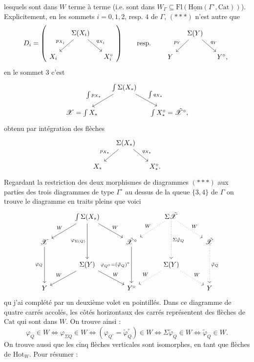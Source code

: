 \documentclass[11pt]{article}
\newcommand{\printedpage}[1]{\marginpar{\footnotesize p.~#1}}
\newcommand{\msp}[1]{\marginpar{\footnotesize [#1]}}
\newcommand{\Cat}{\mathrm{Cat}}
\newcommand{\Hom}{\mathrm{Hom}}
\newcommand{\Hot}{\mathrm{Hot}}
\newcommand{\Fl}{\mathrm{Fl}}
\newcommand{\sX}{\mathscr{X}}
\newcommand{\tsX}{\tilde{\mathscr{X}}}
\begin{document}
lesquels sont dans $W$ terme à terme (i.e. sont dans $W_\Gamma\subseteq\Fl(\underline{\Hom}(\Gamma^\circ,\Cat))$). Explicitement, en les sommets $i=0,1,2$, resp. $4$ de $\Gamma$, $(***)$ n'est autre que
\[
D_i =
\left(
\begin{tikzcd}[column sep=small]
 & \Sigma(X_i) \arrow[dl, "p_{X_i}"'] \arrow[dr, "q_{X_i}"] & \\
X_i & & X_i^\circ
\end{tikzcd}
\right)
\qquad \text{resp.} \qquad
\begin{tikzcd}[column sep=small]
 & \Sigma(Y) \arrow[dl, "p_Y"'] \arrow[dr, "q_Y"] & \\
Y & & Y^\circ,
\end{tikzcd}
\]
en le sommet 3 c'est
\[
\begin{tikzcd}[column sep=small]
 & \int\Sigma(X_*) \arrow[dl, "\int p_{X_*}"'] \arrow[dr, "\int q_{X_*}"] & \\
\sX=\int X_* & & \int X_*^\circ=\tsX^\circ,
\end{tikzcd}
\]
obtenu par intégration des flèches
\[
\begin{tikzcd}[column sep=small]
 & \Sigma(X_*) \arrow[dl, "p_{X_*}"'] \arrow[dr, "q_{X_*}"] & \\
X_* & & X_*^\circ.
\end{tikzcd}
\]
\msp{page 140}
Regardant la restriction des deux morphismes de diagrammes $(***)$ aux parties des trois diagrammes de type $\Gamma^\circ$ au dessus de la queue $\{3,4\}$ de $\Gamma$ on trouve le diagramme en traits pleins que voici
\[
\begin{tikzcd}[column sep=3em, row sep=normal]
 & \int\Sigma(X_*) \arrow[dl, "W"'] \arrow[dr, "W"] \arrow[dd, "\varphi_{\Sigma(Q)}"'] & & \Sigma\tsX \arrow[dl, dotted, "W"'] \arrow[dr, dotted, "W"] \arrow[dd, dotted, "\Sigma\tilde{\varphi}_Q"] & \\
\sX \arrow[dd, "\varphi_Q"'] & & \tsX^\circ \arrow[dd, "\varphi_{Q^\circ}=(\tilde{\varphi}_Q)^\circ"'] & & \tsX \arrow[dd, dotted, "\tilde{\varphi}_Q"] \\
 & \Sigma(Y) \arrow[dl, "W"'] \arrow[dr, "W"] & & \Sigma(Y) \arrow[dl, dotted, "W"'] \arrow[dr, dotted, "W"] & \\
Y & & Y^\circ & & Y
\end{tikzcd}
\]
\printedpage{96}
qu j'ai complété par un deuxième volet en pointillés. Dans ce diagramme de quatre carrés accolés, les côtés horizontaux des carrés représentent des flèches de $\Cat$ qui sont dans $W$. On trouve ainsi : %
\[
\varphi_Q\in W \iff \varphi_{\Sigma Q}\in W \iff (\varphi_{Q^\circ}=\tilde{\varphi}_Q^\circ)\in W \iff \Sigma\tilde{\varphi}_Q\in W \iff \tilde{\varphi}_Q\in W.
\]
On trouve aussi que les cinq flèches verticales sont isomorphes, en tant que flèches de $\Hot_W$. Pour résumer :
\end{document}
